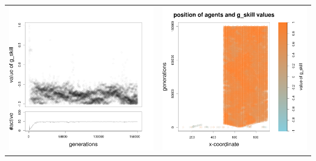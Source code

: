\documentclass[a4paper,10pt]{article}
\begin{document}
\begin{table}[ht]
\begin{tabular}{cc}
 \newline
 \includegraphics[width=\imgSize]{images/5StaticEnv/Gplot5_staticEnv2}&\includegraphics[width=\imgSize]{images/5StaticEnv/Gplot5Static_staticEnv2}\\

\end{tabular}
\end{table}
\end{document}
